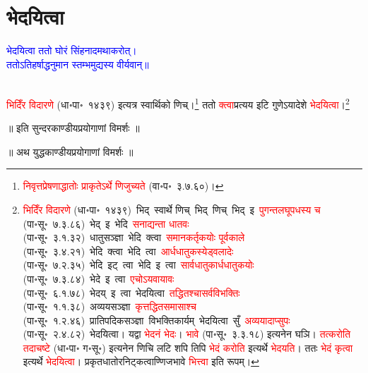 \section[भेदयित्वा]{भेदयित्वा}
\centering\textcolor{blue}{भेदयित्वा ततो घोरं सिंहनादमथाकरोत्।\nopagebreak\\
ततोऽतिहर्षाद्धनुमान स्तम्भमुद्यस्य वीर्यवान्॥}\nopagebreak\\
\\
\begin{sloppypar}\justifying\noindent\hspace{10mm} \textcolor{red}{भिदिँर विदारणे} (धा॰पा॰~१४३९) इत्यत्र स्वार्थिको णिच्।\footnote{\textcolor{red}{निवृत्तप्रेषणाद्धातोः प्राकृतेऽर्थे णिजुच्यते} (वा॰प॰~३.७.६०)।} ततो \textcolor{red}{क्त्वा}\-प्रत्यय इटि गुणेऽयादेशे \textcolor{red}{भेदयित्वा}।\footnote{\textcolor{red}{भिदिँर विदारणे} (धा॰पा॰~१४३९)~\arrow भिद्~\arrow स्वार्थे णिच्~\arrow भिद्~णिच्~\arrow भिद्~इ~\arrow \textcolor{red}{पुगन्त\-लघूपधस्य च} (पा॰सू॰~७.३.८६)~\arrow भेद्~इ~\arrow भेदि~\arrow \textcolor{red}{सनाद्यन्ता धातवः} (पा॰सू॰~३.१.३२)~\arrow धातु\-सञ्ज्ञा~\arrow भेदि~क्त्वा~\arrow \textcolor{red}{समान\-कर्तृकयोः पूर्वकाले} (पा॰सू॰~३.४.२१)~\arrow भेदि~क्त्वा~\arrow भेदि~त्वा~\arrow \textcolor{red}{आर्धधातुकस्येड्वलादेः} (पा॰सू॰~७.२.३५)~\arrow भेदि~इट्~त्वा~\arrow भेदि~इ~त्वा~\arrow \textcolor{red}{सार्वधातुकार्ध\-धातुकयोः} (पा॰सू॰~७.३.८४)~\arrow भेदे~इ~त्वा~\arrow \textcolor{red}{एचोऽयवायावः} (पा॰सू॰~६.१.७८)~\arrow भेदय्~इ~त्वा~\arrow भेदयित्वा~\arrow \textcolor{red}{तद्धितश्चासर्व\-विभक्तिः} (पा॰सू॰~१.१.३८)~\arrow अव्यय\-सञ्ज्ञा~\arrow \textcolor{red}{कृत्तद्धित\-समासाश्च} (पा॰सू॰~१.२.४६)~\arrow प्रातिपदिक\-सञ्ज्ञा~\arrow विभक्तिकार्यम्~\arrow भेदयित्वा~सुँ~\arrow \textcolor{red}{अव्ययादाप्सुपः} (पा॰सू॰~२.४.८२)~\arrow भेदयित्वा। यद्वा \textcolor{red}{भेदनं भेदः}। \textcolor{red}{भावे} (पा॰सू॰~३.३.१८) इत्यनेन घञि। \textcolor{red}{तत्करोति तदाचष्टे} (धा॰पा॰ ग॰सू॰) इत्यनेन णिचि लटि शपि तिपि \textcolor{red}{भेदं करोति} इत्यर्थे  \textcolor{red}{भेदयति}। ततः \textcolor{red}{भेदं कृत्वा} इत्यर्थे \textcolor{red}{भेदयित्वा}। प्रकृत\-धातोरनिट्कत्वाण्णिजभावे \textcolor{red}{भित्त्वा} इति रूपम्।}\end{sloppypar}
\vspace{2mm}
\centering ॥ इति सुन्दरकाण्डीयप्रयोगाणां विमर्शः ॥\nopagebreak\\
\vspace{4mm}
{}
\centering ॥ अथ युद्धकाण्डीयप्रयोगाणां विमर्शः ॥\nopagebreak\\
